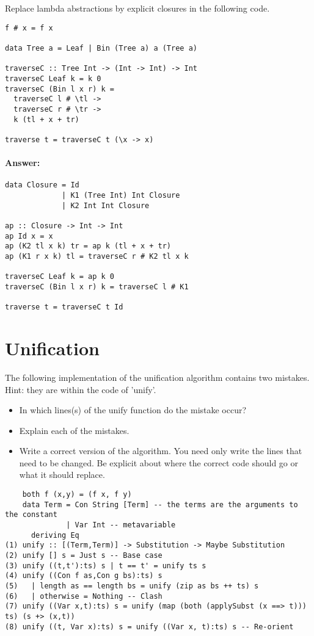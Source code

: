 \documentclass{article}
\newcommand{\answer}[0]{\paragraph{Answer:}}
\begin{document}
Replace lambda abstractions by explicit closures in the following
code.
\begin{verbatim}
f # x = f x

data Tree a = Leaf | Bin (Tree a) a (Tree a)

traverseC :: Tree Int -> (Int -> Int) -> Int
traverseC Leaf k = k 0
traverseC (Bin l x r) k =
  traverseC l # \tl ->
  traverseC r # \tr ->
  k (tl + x + tr)

traverse t = traverseC t (\x -> x)
\end{verbatim}

\answer{
  \begin{verbatim}
data Closure = Id
             | K1 (Tree Int) Int Closure
             | K2 Int Int Closure

ap :: Closure -> Int -> Int
ap Id x = x
ap (K2 tl x k) tr = ap k (tl + x + tr)
ap (K1 r x k) tl = traverseC r # K2 tl x k

traverseC Leaf k = ap k 0
traverseC (Bin l x r) k = traverseC l # K1

traverse t = traverseC t Id
  \end{verbatim}
}
\newpage
\section{Unification}

The following implementation of the unification algorithm contains two mistakes. Hint: they are within the code of 'unify'.
\begin{itemize}
\item In which lines(s) of the unify function do the mistake occur?
\item Explain each of the mistakes. 
\item Write a correct version of the algorithm. You need only write
  the lines that need to be changed. Be explicit about where the
  correct code should go or what it should replace. 
\end{itemize}



\begin{verbatim}
    both f (x,y) = (f x, f y)
    data Term = Con String [Term] -- the terms are the arguments to the constant
              | Var Int -- metavariable
      deriving Eq
(1) unify :: [(Term,Term)] -> Substitution -> Maybe Substitution
(2) unify [] s = Just s -- Base case
(3) unify ((t,t'):ts) s | t == t' = unify ts s
(4) unify ((Con f as,Con g bs):ts) s
(5)   | length as == length bs = unify (zip as bs ++ ts) s
(6)   | otherwise = Nothing -- Clash
(7) unify ((Var x,t):ts) s = unify (map (both (applySubst (x ==> t))) ts) (s +> (x,t))
(8) unify ((t, Var x):ts) s = unify ((Var x, t):ts) s -- Re-orient
\end{verbatim}
\end{document}
